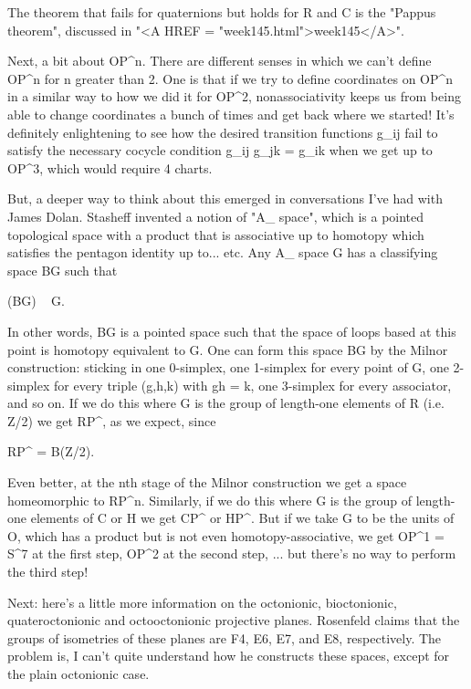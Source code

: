 The theorem that fails for quaternions but holds for R and C is
the "Pappus theorem", discussed in 
"<A HREF = "week145.html">week145</A>".

Next, a bit about OP^{n}.
There are different senses in which we can't define OP^{n} 
for n greater than 2.  One is that if we try to define coordinates
on OP^{n} in a similar way to how we did it for OP^{2}, 
nonassociativity 
keeps us from being able to change coordinates a bunch of times and 
get back where we started!  It's definitely enlightening to see how 
the desired transition functions g_{ij} fail to satisfy the 
necessary
cocycle condition g_{ij} g_{jk} = g_{ik} 
when we get up to OP^{3}, which 
would require 4 charts.

But, a deeper way to think about this emerged in conversations 
I've had with James Dolan.  Stasheff invented a notion of 
"A_{\infty } space", which is a pointed topological space with 
a product that is associative up to homotopy which satisfies the 
pentagon identity up to... etc.  Any A_{\infty } space G has a 
classifying space BG such that 

\Omega (BG) ~ G. 

In other words, 
BG is a pointed space such that the space of loops based at this 
point is homotopy equivalent to G.  One can form this space BG by 
the Milnor construction: sticking in one 0-simplex, one 1-simplex 
for every point of G, one 2-simplex for every triple (g,h,k) with 
gh = k, one 3-simplex for every associator, and so on.  If we do 
this where G is the group of length-one elements of R (i.e. Z/2) 
we get RP^{\infty }, as we expect, since 

RP^{\infty } = B(Z/2).  

Even better, at the nth
stage of the Milnor construction we get a space homeomorphic to 
RP^{n}.  Similarly, if we do this where G is the group of 
length-one elements of C 
or H we get CP^{\infty } or HP^{\infty }.  
But if we take G to be
the units of O, which has a product but is not even homotopy-associative, 
we get OP^{1} = S^{7} at the first 
step, OP^{2} at the
second step, ... but there's no way to perform the third step!

Next: here's a little more information on the octonionic, bioctonionic,
quateroctonionic and octooctonionic projective planes.  
Rosenfeld
claims that the groups of isometries of these planes are F4, E6, E7,
and E8, respectively.  The problem is, I can't quite understand
how he constructs these spaces, except for the plain octonionic
case.  

